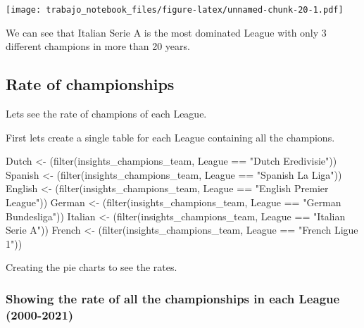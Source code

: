 \documentclass[
]{article}
\newenvironment{Shaded}{\begin{snugshade}}{\end{snugshade}}
\newcommand{\FunctionTok}[1]{\textcolor[rgb]{0.00,0.00,0.00}{#1}}
\newcommand{\NormalTok}[1]{#1}
\newcommand{\OtherTok}[1]{\textcolor[rgb]{0.56,0.35,0.01}{#1}}
\newcommand{\SpecialCharTok}[1]{\textcolor[rgb]{0.00,0.00,0.00}{#1}}
\newcommand{\StringTok}[1]{\textcolor[rgb]{0.31,0.60,0.02}{#1}}
\begin{document}
\texttt{[image: trabajo\_notebook\_files/figure-latex/unnamed-chunk-20-1.pdf]}

We can see that Italian Serie A is the most dominated League with only 3
different champions in more than 20 years.

\hypertarget{rate-of-championships}{%
\subsection{Rate of championships}\label{rate-of-championships}}

Lets see the rate of champions of each League.

First lets create a single table for each League containing all the
champions.

\begin{Shaded}
\begin{Highlighting}[]
\NormalTok{Dutch }\OtherTok{\textless{}{-}}\NormalTok{ (}\FunctionTok{filter}\NormalTok{(insights\_champions\_team, League }\SpecialCharTok{==} \StringTok{"Dutch Eredivisie"}\NormalTok{))}
\NormalTok{Spanish }\OtherTok{\textless{}{-}}\NormalTok{ (}\FunctionTok{filter}\NormalTok{(insights\_champions\_team, League }\SpecialCharTok{==} \StringTok{"Spanish La Liga"}\NormalTok{))}
\NormalTok{English }\OtherTok{\textless{}{-}}\NormalTok{ (}\FunctionTok{filter}\NormalTok{(insights\_champions\_team, League }\SpecialCharTok{==} \StringTok{"English Premier League"}\NormalTok{))}
\NormalTok{German }\OtherTok{\textless{}{-}}\NormalTok{ (}\FunctionTok{filter}\NormalTok{(insights\_champions\_team, League }\SpecialCharTok{==} \StringTok{"German Bundesliga"}\NormalTok{))}
\NormalTok{Italian }\OtherTok{\textless{}{-}}\NormalTok{ (}\FunctionTok{filter}\NormalTok{(insights\_champions\_team, League }\SpecialCharTok{==} \StringTok{"Italian Serie A"}\NormalTok{))}
\NormalTok{French }\OtherTok{\textless{}{-}}\NormalTok{ (}\FunctionTok{filter}\NormalTok{(insights\_champions\_team, League }\SpecialCharTok{==} \StringTok{"French Ligue 1"}\NormalTok{))}
\end{Highlighting}
\end{Shaded}

Creating the pie charts to see the rates.

\hypertarget{showing-the-rate-of-all-the-championships-in-each-league-2000-2021}{%
\subsubsection{Showing the rate of all the championships in each League
(2000-2021)}\label{showing-the-rate-of-all-the-championships-in-each-league-2000-2021}}
\end{document}
